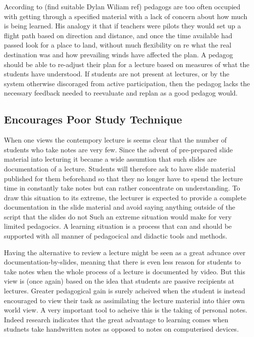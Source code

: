 \documentclass[a4paper,10pt]{article}
\begin{document}
According to (find suitable Dylan Wiliam ref) pedagogs are too often occupied with getting through a specified material with a lack of concern about how much is being learned. His analogy it that if teachers were pilots they would set up a flight path based on direction and distance, and once the time available had passed look for a place to land, without much flexibility on re what the real destination was and how prevailing winds have affected the plan. A pedagog should be able to re-adjust their plan for a lecture based on measures of what the students have understood. If students are not present at lectures, or by the system otherwise discoraged from active participation, then the pedagog lacks the necessary feedback needed to reevaluate and replan as a good pedagog would.



\subsection{Encourages Poor Study Technique}
When one views the contempory lecture is seems clear that the number of students who take notes are very few. Since the advent of pre-prepared slide material into lecturing it became a wide assumtion that such slides are documentation of a lecture. Students will therefore ask to have slide material published for them beforehand so that they no longer have to spend the lecture time in constantly take notes but can rather concentrate on understanding. To draw this situation to its extreme, the lecturer is expected to provide a complete documentation in the slide material and avoid saying anything outside of the script that the slides do not  Such an extreme situation would make for very limited pedagocics. A learning situation is a process that can and should be supported with all manner of pedagocical and didactic tools and methods.

Having the alternative to review a lecture might be seen as a great advance over documentation-by-slides, meaning that there is even less reason for students to take notes when the whole process of a lecture is documented by video. But this view is (once again) based on the idea that students are passive recipients at lectures. Greater pedagogical gain is surely acheived when the student is instead encouraged to view their task as assimilating the lecture material into thier own world view. A very important tool to acheive this is the taking of personal notes. Indeed research indicates that the great advantage to learning comes when studnets take handwritten notes as opposed to notes on computerised devices.
\end{document}
